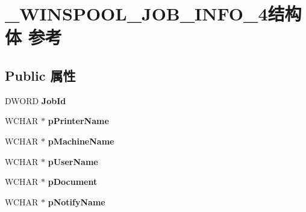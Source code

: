 \hypertarget{struct___w_i_n_s_p_o_o_l___j_o_b___i_n_f_o__4}{}\section{\+\_\+\+W\+I\+N\+S\+P\+O\+O\+L\+\_\+\+J\+O\+B\+\_\+\+I\+N\+F\+O\+\_\+4结构体 参考}
\label{struct___w_i_n_s_p_o_o_l___j_o_b___i_n_f_o__4}
\subsection*{Public 属性}
\begin{DoxyCompactItemize}
\item 
\mbox{\label{struct___w_i_n_s_p_o_o_l___j_o_b___i_n_f_o__4_a111027551a3a15cfe5699f0e8510ec58}} 
D\+W\+O\+RD {\bfseries Job\+Id}
\item 
\mbox{\label{struct___w_i_n_s_p_o_o_l___j_o_b___i_n_f_o__4_a3836832f862c5b9b33f29342e2ca22a1}} 
W\+C\+H\+AR $\ast$ {\bfseries p\+Printer\+Name}
\item 
\mbox{\label{struct___w_i_n_s_p_o_o_l___j_o_b___i_n_f_o__4_a87baa868e187b07c33df746d2d024e18}} 
W\+C\+H\+AR $\ast$ {\bfseries p\+Machine\+Name}
\item 
\mbox{\label{struct___w_i_n_s_p_o_o_l___j_o_b___i_n_f_o__4_acc227d81774d10ff9f0d147289b32eca}} 
W\+C\+H\+AR $\ast$ {\bfseries p\+User\+Name}
\item 
\mbox{\label{struct___w_i_n_s_p_o_o_l___j_o_b___i_n_f_o__4_ac313bb81064c5e7bdf4754e541c843a4}} 
W\+C\+H\+AR $\ast$ {\bfseries p\+Document}
\item 
\mbox{\label{struct___w_i_n_s_p_o_o_l___j_o_b___i_n_f_o__4_ab526ad06f55a1b07693e55b999ed6c17}} 
W\+C\+H\+AR $\ast$ {\bfseries p\+Notify\+Name}
\item 
\mbox{\label{struct___w_i_n_s_p_o_o_l___j_o_b___i_n_f_o__4_a2b734ba5d5c8714dbc2a4bfd5feed391}} 

\end{DoxyCompactItemize}
